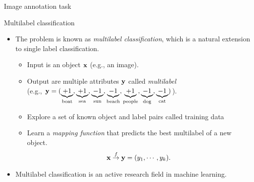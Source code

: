 \documentclass[first=dgreen,second=purple,logo=yellowexc]{aaltoslides}
\begin{document}
{\begin{frame}{Image annotation task}
{\begin{center}
	\end{center}
	}
\end{frame}


\begin{frame}{Multilabel classification}
	\begin{itemize}
		\item The problem is known as \textit{multilabel classification}, which is a natural extension to single label classification.
		\begin{itemize}
			\footnotesize
			\item Input is an object $\mathbf {x}$ (e.g., an image).
			\item Output are multiple attributes $\mathbf {y}$ called \textit{multilabel}\\
			(e.g., $\mathbf {y}=(\underbrace{+1}_{\text{boat}},\underbrace{+1}_{\text{sea}},\underbrace{-1}_{\text{sun}},\underbrace{-1}_{\text{beach}},\underbrace{+1}_{\text{people}},\underbrace{-1}_{\text{dog}},\underbrace{-1}_{\text{cat}})$).
			\item Explore a set of known object and label pairs called {training data} \\
			\item Learn a \textit{mapping function} that predicts the best multilabel of a new object.
			\begin{align*}
				\mathbf {x}\overset{f}{\rightarrow}\mathbf {y}=(y_1,\cdots,y_k).
			\end{align*}
		\end{itemize}
		\item Multilabel classification is an active research field in machine learning.
	\end{itemize}
\end{frame}

}
\end{document}
